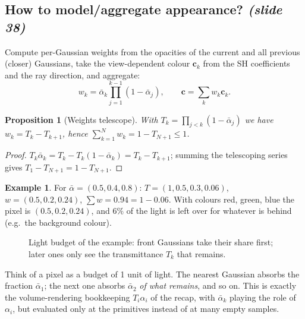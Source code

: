 \documentclass[11pt,a4paper]{article}
\newcommand{\sr}[1]{\texorpdfstring{\emph{(#1)}}{(#1)}}
\newcommand{\abar}{\bar\alpha}
\theoremstyle{definition}
\newtheorem{example}[definition]{Example}
\theoremstyle{plain}
\newtheorem{proposition}[definition]{Proposition}
\theoremstyle{remark}
\begin{document}
\subsection{How to model/aggregate appearance? \sr{slide 38}}
Compute per-Gaussian weights from the opacities of the current and all previous (closer) Gaussians, take the view-dependent colour $\bm c_k$ from the SH coefficients and the ray direction, and aggregate:
\[
w_k=\abar_k\prod_{j=1}^{k-1}(1-\abar_j),\qquad\bm c=\sum_kw_k\bm c_k.
\]

\begin{proposition}[Weights telescope]\label{prop:telescope}
With $T_k=\prod_{j<k}(1-\abar_j)$ we have $w_k=T_k-T_{k+1}$, hence $\sum_{k=1}^Nw_k=1-T_{N+1}\le1$.
\end{proposition}
\begin{proof}
$T_k\abar_k=T_k-T_k(1-\abar_k)=T_k-T_{k+1}$; summing the telescoping series gives $T_1-T_{N+1}=1-T_{N+1}$.
\end{proof}

\begin{example}
For $\abar=(0.5,0.4,0.8)$: $T=(1,0.5,0.3,0.06)$, $w=(0.5,0.2,0.24)$, $\sum w=0.94=1-0.06$. With colours red, green, blue the pixel is $(0.5,0.2,0.24)$, and $6\%$ of the light is left over for whatever is behind (e.g.\ the background colour).
\end{example}

\begin{figure}[htbp]
\centering
{}
\caption{Light budget of the example: front Gaussians take their share first; later ones only see the transmittance $T_k$ that remains.}
\end{figure}

\begin{intuition}
Think of a pixel as a budget of 1 unit of light. The nearest Gaussian absorbs the fraction $\abar_1$; the next one absorbs $\abar_2$ \emph{of what remains}, and so on. This is exactly the volume-rendering bookkeeping $T_i\alpha_i$ of the recap, with $\abar_k$ playing the role of $\alpha_i$, but evaluated only at the primitives instead of at many empty samples.
\end{intuition}
\end{document}
